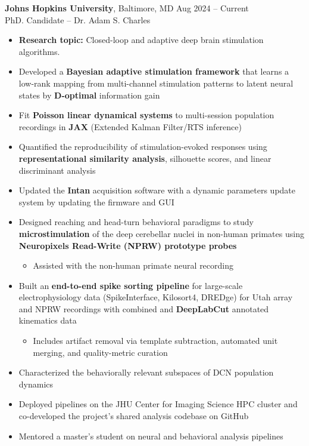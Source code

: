 \documentclass[11pt,letterpaper]{article}
\begin{document}
\textbf{Johns Hopkins University}, Baltimore, MD \hfill Aug 2024 -- Current\\
PhD. Candidate -- Dr. Adam S. Charles

\begin{itemize}
\item \textbf{Research topic:} Closed-loop and adaptive deep brain stimulation algorithms.
\item Developed a \textbf{Bayesian adaptive stimulation framework} that learns a low-rank mapping from multi-channel stimulation patterns to latent neural states by \textbf{D-optimal} information gain
\item Fit \textbf{Poisson linear dynamical systems} to multi-session population recordings in \textbf{JAX} (Extended Kalman Filter/RTS inference)
\item Quantified the reproducibility of stimulation-evoked responses using \textbf{representational similarity analysis}, silhouette scores, and linear discriminant analysis
\item Updated the \textbf{Intan} acquisition software with a dynamic parameters update system by updating the firmware and GUI
\item Designed reaching and head-turn behavioral paradigms to study \textbf{microstimulation} of the deep cerebellar nuclei in non-human primates using \textbf{Neuropixels Read-Write (NPRW) prototype probes}
    \begin{itemize}
    \item Assisted with the non-human primate neural recording
    \end{itemize}
\item Built an \textbf{end-to-end spike sorting pipeline} for large-scale electrophysiology data (SpikeInterface, Kilosort4, DREDge) for Utah array and NPRW recordings with combined and \textbf{DeepLabCut} annotated kinematics data
    \begin{itemize}
    \item Includes artifact removal via template subtraction, automated unit merging, and quality-metric curation
    \end{itemize}
\item Characterized the behaviorally relevant subspaces of DCN population dynamics
\item Deployed pipelines on the JHU Center for Imaging Science HPC cluster and co-developed the project's shared analysis codebase on GitHub
\item Mentored a master's student on neural and behavioral analysis pipelines
\end{itemize}
\end{document}
